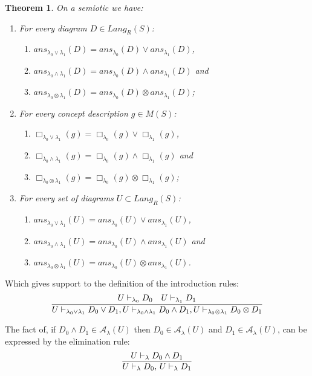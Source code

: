 \documentclass[oribibl]{llncs}
\newtheorem{thm}{Theorem}
\newcommand{\A}{\mathcal{A}}
\begin{document}
\begin{thm} On a semiotic we have:
\begin{enumerate}
  \item For every diagram $D\in Lang_R(S)$:
   \begin{enumerate}
     \item $ans_{\lambda_0\vee\lambda_1}(D)=ans_{\lambda_0}(D)\vee
  ans_{\lambda_1}(D)$,
     \item $ans_{\lambda_0\wedge\lambda_1}(D)=ans_{\lambda_0}(D)\wedge
  ans_{\lambda_1}(D)$ and
     \item $ans_{\lambda_0\otimes\lambda_1}(D)=ans_{\lambda_0}(D)\otimes
  ans_{\lambda_1}(D)$;
   \end{enumerate}

  \item For every concept description $g\in M(S)$:
  \begin{enumerate}
    \item $\Box_{\lambda_0\vee\lambda_1}(g)=\Box_{\lambda_0}(g)\vee
  \Box_{\lambda_1}(g)$,
    \item $\Box_{\lambda_0\wedge\lambda_1}(g)=\Box_{\lambda_0}(g)\wedge
  \Box_{\lambda_1}(g)$ and
    \item $\Box_{\lambda_0\otimes\lambda_1}(g)=\Box_{\lambda_0}(g)\otimes
  \Box_{\lambda_1}(g)$;
  \end{enumerate}

  \item For every set of diagrams $U\subset Lang_R(S)$:
  \begin{enumerate}
    \item $ans_{\lambda_0\vee\lambda_1}(U)=ans_{\lambda_0}(U)\vee
  ans_{\lambda_1}(U)$,
    \item $ans_{\lambda_0\wedge\lambda_1}(U)=ans_{\lambda_0}(U)\wedge
  ans_{\lambda_1}(U)$ and
    \item $ans_{\lambda_0\otimes\lambda_1}(U)=ans_{\lambda_0}(U)\otimes
  ans_{\lambda_1}(U)$.
  \end{enumerate}

\end{enumerate}
\end{thm}

Which gives support to the definition of the introduction rules:
\[
\infer{U\vdash_{\lambda_0\vee\lambda_1} D_0\vee D_1,
U\vdash_{\lambda_0\wedge\lambda_1} D_0\wedge D_1,
U\vdash_{\lambda_0\otimes\lambda_1} D_0\otimes
D_1}{U\vdash_{\lambda_0}D_0 &  U\vdash_{\lambda_1}D_1}
\]

The fact of, if $D_0\wedge D_1\in \A_\lambda(U)$ then $D_0\in
\A_\lambda(U)$ and $D_1\in \A_\lambda(U)$, can be expressed by the elimination rule:
\[
\infer{U\vdash_\lambda D_0,\,U\vdash_\lambda D_1}{U\vdash_\lambda D_0\wedge D_1}
\]
\end{document}
